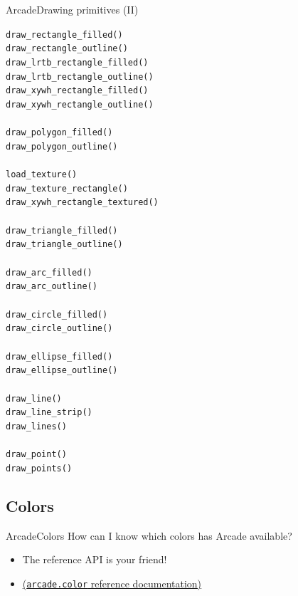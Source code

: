 \documentclass[10pt,compress]{beamer} %
\begin{document}
\begin{frame}[shrink]{Arcade}{Drawing primitives (II)}
  	\begin{multicols}{2}
		\texttt{draw\_rectangle\_filled()}\\	
		\texttt{draw\_rectangle\_outline()}\\
		\texttt{draw\_lrtb\_rectangle\_filled()}\\
		\texttt{draw\_lrtb\_rectangle\_outline()}\\
		\texttt{draw\_xywh\_rectangle\_filled()}\\
		\texttt{draw\_xywh\_rectangle\_outline()}\\
		\texttt{ }\\
		\texttt{draw\_polygon\_filled()}\\
		\texttt{draw\_polygon\_outline()}\\
		\texttt{ }\\
		\texttt{load\_texture()}\\
		\texttt{draw\_texture\_rectangle()}\\
		\texttt{draw\_xywh\_rectangle\_textured()}\\
		\texttt{ }\\
		\texttt{draw\_triangle\_filled()}\\
		\texttt{draw\_triangle\_outline()}\\
		\texttt{ }\\
		\texttt{draw\_arc\_filled()}\\
		\texttt{draw\_arc\_outline()}\\
		\texttt{ }\\
		\texttt{draw\_circle\_filled()}\\
		\texttt{draw\_circle\_outline()}\\
		\texttt{ }\\
		\texttt{draw\_ellipse\_filled()}\\
		\texttt{draw\_ellipse\_outline()}\\
		\texttt{ }\\
		\texttt{draw\_line()}\\
		\texttt{draw\_line\_strip()}\\
		\texttt{draw\_lines()}\\
		\texttt{ }\\
		\texttt{draw\_point()}\\
		\texttt{draw\_points()}
	\end{multicols}
\end{frame}

\subsection{Colors}
\begin{frame}{Arcade}{Colors}
	How can I know which colors has Arcade available?
	\begin{itemize}
		\item The reference API is your friend!
		\item \href{https://api.arcade.academy/en/2.6.17/arcade.color.html}{(\texttt{arcade.color} reference documentation)}
	\end{itemize}
\end{frame}
\end{document}
